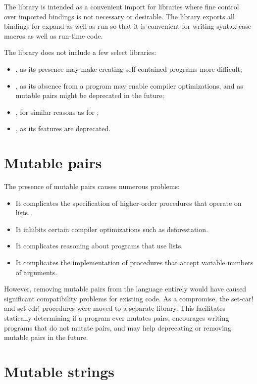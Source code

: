 \documentclass[twoside,twocolumn]{algol60}
\begin{document}
The \thersixlibrary{} library is intended as a convenient import for
libraries where fine control over imported bindings is not necessary
or desirable. The \thersixlibrary{} library exports all bindings for
{\cf expand} as well as {\cf run} so that it is convenient for writing
{\cf syntax-case} macros as well as run-time code.

The \thersixlibrary{} library does not include a few select libraries:
%
\begin{itemize}
\item {}, as its presence may make creating
  self-contained programs more difficult;
\item {}, as its absence from a program may enable compiler
  optimizations, and as mutable pairs might be deprecated in the future;
\item {}, for similar reasons as for
  ;
\item {}, as its features are deprecated.
\end{itemize}

\chapter{Mutable pairs}

The presence of mutable pairs causes numerous problems:
%
\begin{itemize}
\item It complicates the specification of higher-order procedures that
  operate on lists.
\item It inhibits certain compiler optimizations such as
  deforestation.
\item It complicates reasoning about programs that use lists.
\item It complicates the implementation of procedures that accept
  variable numbers of arguments.
\end{itemize}
%
However, removing mutable pairs from the language entirely would have
caused significant compatibility problems for existing code.  As a
compromise, the {\cf set-car!} and {\cf set-cdr!} procedures were
moved to a separate library.  This facilitates statically determining
if a program ever mutates pairs, encourages writing programs that do
not mutate pairs, and may help deprecating or removing mutable pairs
in the future.

\chapter{Mutable strings}
\end{document}
